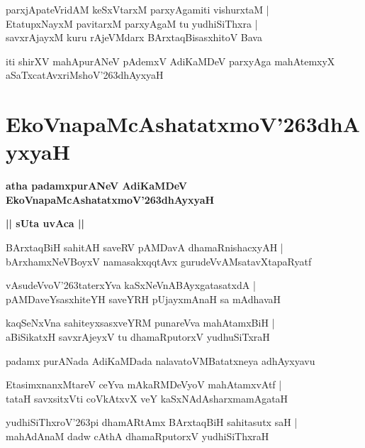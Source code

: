\documentclass[twoside,12pt,openright]{book}
\def\S{\char'263}
\newcounter{shloka}[chapter]
\def\uvaca#1{\centerline{{\large\textbf{#1}}}}
\begin{document}
\begin{shloka}
parxjApateVridAM keSxVtarxM parxyAgamiti vishurxtaM |\\
EtatupxNayxM pavitarxM parxyAgaM tu yudhiSiThxra |\\
savxrAjayxM kuru rAjeVMdarx BArxtaqBisasxhitoV Bava
\end{shloka}

\begin{center}
iti shirXV mahApurANeV pAdemxV AdiKaMDeV parxyAga mahAtemxyX aSaTxcatAvxriMshoV\S dhAyxyaH 
\end{center}

\chapter{EkoVnapaMcAshatatxmoV\S dhAyxyaH}

\begin{center}
{\LARGE\bfseries atha padamxpurANeV AdiKaMDeV EkoVnapaMcAshatatxmoV\S dhAyxyaH}
\end{center}

\uvaca{|| sUta uvAca ||}

\begin{shloka}
BArxtaqBiH sahitAH saveRV pAMDavA dhamaRnishacxyAH |\\
bArxhamxNeVBoyxV namasakxqqtAvx gurudeVvAMsatavXtapaRyatf 
\end{shloka}

\begin{shloka}
vAsudeVvoV\S taterxYva kaSxNeVnABAyxgatasatxdA |\\
pAMDaveYsasxhiteYH saveYRH pUjayxmAnaH sa mAdhavaH 
\end{shloka}

\begin{shloka}
kaqSeNxVna sahiteyxsasxveYRM punareVva mahAtamxBiH |\\
aBiSikatxH savxrAjeyxV tu dhamaRputorxV yudhuSiTxraH
\end{shloka}

\begin{center}
padamx purANada AdiKaMDada nalavatoVMBatatxneya adhAyxyavu
\end{center}

\begin{shloka}
EtasimxnanxMtareV ceYva mAkaRMDeVyoV mahAtamxvAtf |\\
tataH savxsitxVti coVkAtxvX veY kaSxNAdAsharxmamAgataH 
\end{shloka}

\begin{shloka}
yudhiSiThxroV\S pi dhamARtAmx BArxtaqBiH sahitasutx saH |\\
mahAdAnaM dadw cAthA dhamaRputorxV  yudhiSiThxraH 
\end{shloka}
\end{document}
